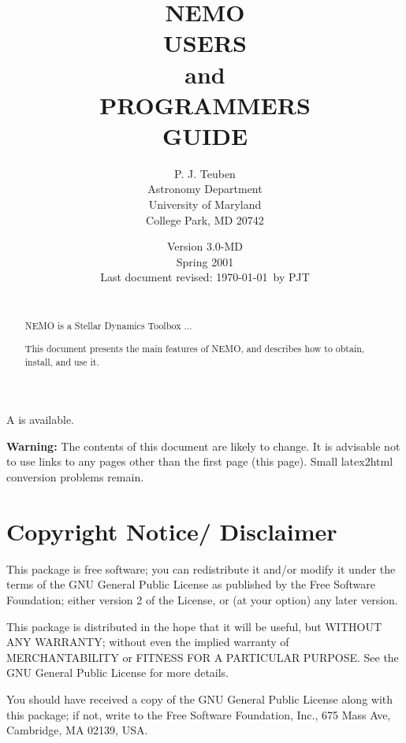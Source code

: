 \documentclass[headsepline,normalheadings]{book}
\title{ {\Huge NEMO} \\
           {\LARGE USERS \\ 
                   and \\
               PROGRAMMERS \\ 
                  GUIDE}}
\author{
 {P. J. Teuben} \\
 {Astronomy Department} \\
 {University of Maryland} \\
 {College Park, MD 20742}
       }
\date{{\small Version 3.0-MD} \\
      {\small Spring 2001} \\
      {\small Last document revised: \today\ by PJT} \\ \\
     }
\begin{document}

\setlength{\parindent}{0pt}
\setlength{\parskip}{2.5mm}

\maketitle
\begin{htmlonly}
A 
is available. 

{\bf Warning:} The contents of this document are likely to change.
It is advisable not to use links to any pages other than the first
page (this page). Small latex2html conversion problems remain.
\end{htmlonly}

\begin{abstract} 
NEMO is a Stellar Dynamics Toolbox ...

This document presents the main features of NEMO, and
describes how to obtain, install, and use it.
\end{abstract}


\pagestyle{empty}
\newpage

\small
\section*{Copyright Notice/ Disclaimer}

This package is free software; you can redistribute it and/or modify
it under the terms of the GNU General Public License as published by
the Free Software Foundation; either version 2 of the License, or
(at your option) any later version.

This package is distributed in the hope that it will be useful,
but WITHOUT ANY WARRANTY; without even the implied warranty of
MERCHANTABILITY or FITNESS FOR A PARTICULAR PURPOSE.  See the
GNU General Public License for more details.

You should have received a copy of the GNU General Public License
along with this package; if not, write to the Free Software
Foundation, Inc., 675 Mass Ave, Cambridge, MA 02139, USA.
\end{document}
